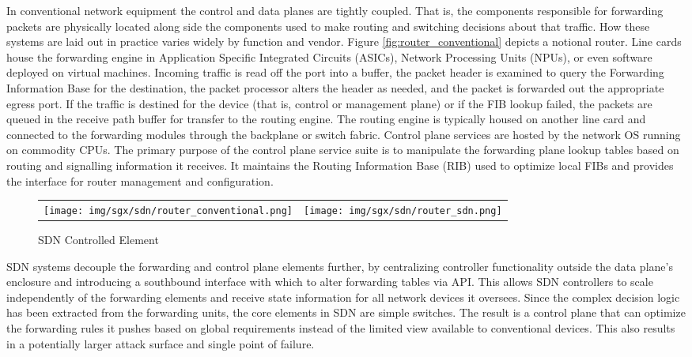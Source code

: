 In conventional network equipment the control and data planes are tightly coupled. That is, the components responsible for forwarding packets are physically located along side the components used to make routing and switching decisions about that traffic. How these systems are laid out in practice varies widely by function and vendor. Figure \ref{fig:router_conventional} depicts a notional router. Line cards house the forwarding engine in Application Specific Integrated Circuits (ASICs), Network Processing Units (NPUs), or even software deployed on virtual machines. Incoming traffic is read off the port into a buffer, the packet header is examined to query the Forwarding Information Base for the destination, the packet processor alters the header as needed, and the packet is forwarded out the appropriate egress port. If the traffic is destined for the device (that is, control or management plane) or if the FIB lookup failed, the packets are queued in the receive path buffer for transfer to the routing engine. The routing engine is typically housed on another line card and connected to the forwarding modules through the backplane or switch fabric. Control plane services are hosted by the network OS running on commodity CPUs. The primary purpose of the control plane service suite is to manipulate the forwarding plane lookup tables based on routing and signalling information it receives. It maintains the Routing Information Base (RIB) used to optimize local FIBs and provides the interface for router management and configuration. 

\begin{figure}[H]
\begin{tabular}{p{}p{}}
\begin{minipage}{.48\textwidth}
\centering
\texttt{[image: img/sgx/sdn/router\_conventional.png]}
\caption{Conventional Element}
\label{fig:router_conventional}
\end{minipage}
&
\begin{minipage}{.47\textwidth}
\centering
\texttt{[image: img/sgx/sdn/router\_sdn.png]}
\caption{SDN Controlled Element}
\label{fig:router_sdn}
\end{minipage}
\end{tabular}
\end{figure}

SDN systems decouple the forwarding and control plane elements further, by centralizing controller functionality outside the data plane's enclosure and introducing a southbound interface with which to alter forwarding tables via API. This allows SDN controllers to scale independently of the forwarding elements and receive state information for all network devices it oversees. Since the complex decision logic has been extracted from the forwarding units, the core elements in SDN are simple switches. The result is a control plane that can optimize the forwarding rules it pushes based on global requirements instead of the limited view available to conventional devices. This also results in a potentially larger attack surface and single point of failure. 


